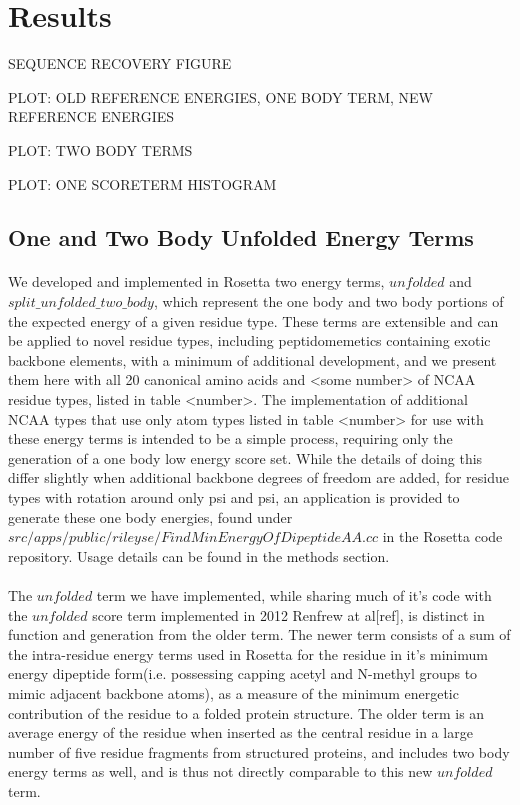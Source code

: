 \section{Results}
SEQUENCE RECOVERY FIGURE

PLOT: OLD REFERENCE ENERGIES, ONE BODY TERM, NEW REFERENCE ENERGIES

PLOT: TWO BODY TERMS

PLOT: ONE SCORETERM HISTOGRAM

\subsection{One and Two Body Unfolded Energy Terms}
\paragraph{}
We developed and implemented in Rosetta two energy terms, $unfolded$ and $split\_unfolded\_two\_body$, which represent the one body and two body portions of the expected energy of a given residue type. These terms are extensible and can be applied to novel residue types, including peptidomemetics containing exotic backbone elements, with a minimum of additional development, and we present them here with all 20 canonical amino acids and <some number> of NCAA residue types, listed in table <number>. The implementation of additional NCAA types that use only atom types listed in table <number> for use with these energy terms is intended to be a simple process, requiring only the generation of a one body low energy score set. While the details of doing this differ slightly when additional backbone degrees of freedom are added, for residue types with rotation around only psi and psi, an application is provided to generate these one body energies, found under $src/apps/public/rileyse/FindMinEnergyOfDipeptideAA.cc$ in the Rosetta code repository. Usage details can be found in the methods section.

\paragraph{}
The $unfolded$ term we have implemented, while sharing much of it's code with the $unfolded$ score term implemented in 2012 Renfrew at al[ref], is distinct in function and generation from the older term. The newer term consists of a sum of the intra-residue energy terms used in Rosetta for the residue in it's minimum energy dipeptide form(i.e. possessing capping acetyl and N-methyl groups to mimic adjacent backbone atoms), as a measure of the minimum energetic contribution of the residue to a folded protein structure. The older term is an average energy of the residue when inserted as the central residue in a large number of five residue fragments from structured proteins, and includes two body energy terms as well, and is thus not directly comparable to this new $unfolded$ term.

